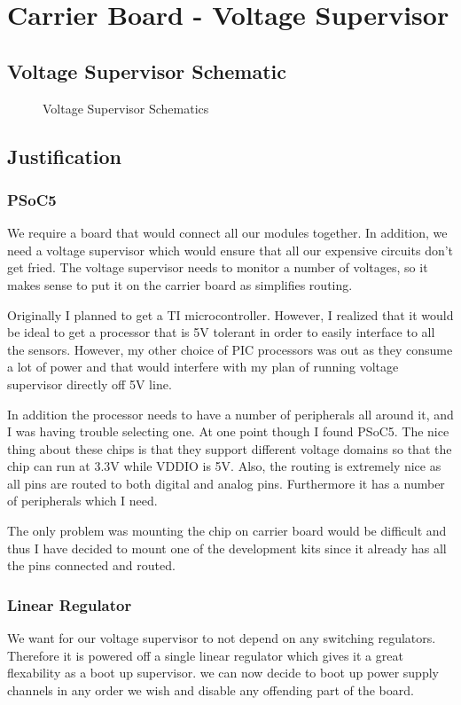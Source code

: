 \documentclass[12pt]{article}
\newcommand{\figuremine}[2]{
\begin{figure}[H]
\noindent\makebox[\textwidth]{
 \texttt{[image: \#1]}}
 \caption{#2}
\end{figure}
}
\begin{document}
\section{Carrier Board - Voltage Supervisor}
\subsection{Voltage Supervisor Schematic}
\figuremine{~/ece445/Chalk-Bot/Hardware/Carrier/page1.png}{Voltage Supervisor Schematics}
\subsection{Justification}
\subsubsection{PSoC5}
We require a board that would connect all our modules together. In addition, we need a voltage supervisor which would ensure that all our expensive circuits don't get fried. The voltage supervisor needs to monitor a number of voltages, so it makes sense to put it on the carrier board as simplifies routing.

Originally I planned to get a TI microcontroller. However, I realized that it would be ideal to get a processor that is 5V tolerant in order to easily interface to all the sensors. However, my other choice of PIC processors was out as they consume a lot of power and that would interfere with my plan of running voltage supervisor directly off 5V line. 

In addition the processor needs to have a number of peripherals all around it, and I was having trouble selecting one. At one point though I found PSoC5. The nice thing about these chips is that they support different voltage domains so that the chip can run at 3.3V while VDDIO is 5V. Also, the routing is extremely nice as all pins are routed to both digital and analog pins.  Furthermore it has a number of peripherals which I need.

The only problem was mounting the chip on carrier board would be difficult and thus I have decided to mount one of the development kits since it already has all the pins connected and routed. 
\subsubsection{Linear Regulator}
We want for our voltage supervisor to not depend on any switching regulators. Therefore it is powered off a single linear regulator which gives it a great flexability as a boot up supervisor. we can now decide to boot up power supply channels in any order we wish and disable any offending part of the board.
\end{document}
